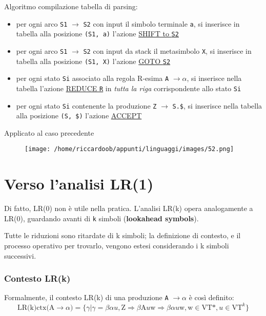 Algoritmo compilazione tabella di parsing:
\begin{itemize}
    \item per ogni arco \texttt{S1} $\rightarrow$ \texttt{S2} con input il simbolo terminale \texttt{a}, si inserisce in tabella alla posizione \texttt{(S1, a)} l'azione \underline{SHIFT to \texttt{S2}}
    \item per ogni arco \texttt{S1} $\rightarrow$ \texttt{S2} con input da stack il metasimbolo \texttt{X}, si inserisce in tabella alla posizione \texttt{(S1, X)} l'azione \underline{GOTO \texttt{S2}}
    \item per ogni stato \texttt{Si} associato alla regola R-esima \texttt{A} $\rightarrow \alpha$, si inserisce nella tabella l'azione \underline{REDUCE \texttt{R}} in \textit{tutta la riga} corrispondente allo stato \texttt{Si}
    \item per ogni stato \texttt{Si} contenente la produzione \texttt{Z} $\rightarrow$ \texttt{S.\$}, si inserisce nella tabella alla posizione \texttt{(S, \$)} l'azione \underline{ACCEPT}
\end{itemize}

Applicato al caso precedente
\begin{figure}[H]
    \centering
    \texttt{[image: /home/riccardoob/appunti/linguaggi/images/52.png]}
\end{figure}

\section{Verso l'analisi LR(1)}
Di fatto, LR(0) non è utile nella pratica. L'analisi LR(k) opera analogamente a LR(0), guardando avanti di \texttt{k} simboli (\textbf{lookahead symbols}).

Tutte le riduzioni sono ritardate di k simboli; la definizione di contesto, e il processo operativo per trovarlo, vengono estesi considerando i k simboli successivi.

\subsubsection{Contesto LR(k)}

\begin{mdframed}[topline=false,bottomline=false,rightline=false]
Formalmente, il contesto LR(k) di una produzione \texttt{A} $\rightarrow \alpha$ è così definito:
\begin{equation*}
\text{LR(k)ctx(A} \rightarrow \alpha ) = \{\gamma | \gamma = \beta\alpha \textit{u}, \text{Z} \Rightarrow \beta \text{A}\textit{u}\text{w} \Rightarrow  \beta\alpha \textit{u}\text{w}, \text{w} \in \text{VT*}, \textit{u} \in \text{VT}^k\}
\end{equation*}
\end{mdframed}

